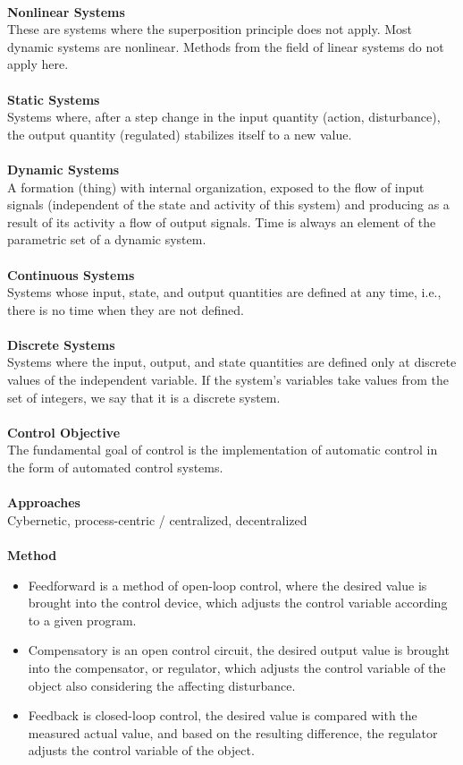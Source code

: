 \documentclass[12pt]{article}
\begin{document}
\\
\textbf{Nonlinear Systems}\\
These are systems where the superposition principle does not apply. Most dynamic
systems are nonlinear. Methods from the field of linear systems do not apply here.\\
\\
\textbf{Static Systems}\\
Systems where, after a step change in the input quantity (action, disturbance), the
output quantity (regulated) stabilizes itself to a new value.\\
\\
\textbf{Dynamic Systems}\\
A formation (thing) with internal organization, exposed to the flow of input signals
(independent of the state and activity of this system) and producing as a result of its
activity a flow of output signals. Time is always an element of the parametric set of a
dynamic system.\\
\\
\textbf{Continuous Systems}\\
Systems whose input, state, and output quantities are defined at any time, i.e.,
there is no time when they are not defined.\\
\\
\textbf{Discrete Systems}\\
Systems where the input, output, and state quantities are defined only at discrete
values of the independent variable. If the system's variables take values from the
set of integers, we say that it is a discrete system.\\
\\
\textbf{Control Objective}\\
The fundamental goal of control is the implementation of automatic control in the
form of automated control systems.\\
\\
\textbf{Approaches}\\
Cybernetic, process-centric / centralized, decentralized\\
\\
\textbf{Method}\\
\begin{itemize}
    \item Feedforward is a method of open-loop control, where the desired value is brought into the control device, which adjusts the control variable according to a given program.
    \item Compensatory is an open control circuit, the desired output value is brought into the compensator, or regulator, which adjusts the control variable of the object also considering the affecting disturbance.
    \item Feedback is closed-loop control, the desired value is compared with the measured actual value, and based on the resulting difference, the regulator adjusts the control variable of the object.
\end{itemize}
\end{document}
